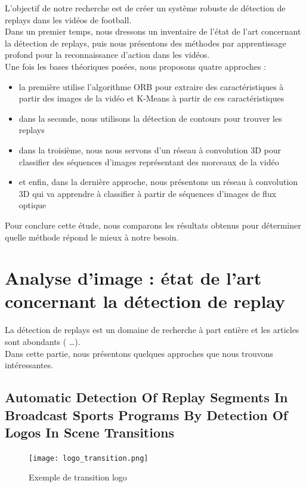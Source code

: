 \documentclass[11pt]{article}
\begin{document}
L'objectif de notre recherche est de créer un système robuste de détection de replays dans les vidéos de football.\\
Dans un premier temps, nous dressons un inventaire de l'état de l'art concernant la détection de replays, puis nous présentons des méthodes par apprentissage profond pour la reconnaissance d'action dans les vidéos.\\
Une fois les bases théoriques posées, nous proposons quatre approches :\\
\begin{itemize}
\item la première utilise l'algorithme ORB \cite{Rublee_2011} pour extraire des caractéristiques à partir des images de la vidéo et K-Means à partir de ces caractéristiques\\
\item dans la seconde, nous utilisons la détection de contours pour trouver les replays\\
\item dans la troisième, nous nous servons d'un réseau à convolution 3D pour classifier des séquences d'images représentant des morceaux de la vidéo\\
\item et enfin, dans la dernière approche, nous présentons un réseau à convolution 3D qui va apprendre à classifier à partir de séquences d'images de flux optique\\
\end{itemize}
Pour conclure cette étude, nous comparons les résultats obtenus pour déterminer quelle méthode répond le mieux à notre besoin.\\

\newpage
\section{Analyse d'image : état de l'art concernant la détection de replay}
\label{sec:org03511db}
La détection de replays est un domaine de recherche à part entière et les articles sont abondants (\cite{Hao_Pan_2002,Ling_Yu_Duan,Chu_2015,Javed_2019} \ldots{}).\\
Dans cette partie, nous présentons quelques approches que nous trouvons intéressantes.\\

\subsection{Automatic Detection Of Replay Segments In Broadcast Sports Programs By Detection Of Logos In Scene Transitions}
\label{sec:org893bcaf}
\begin{figure}[htbp]
\centering
\texttt{[image: logo\_transition.png]}
\caption{Exemple de transition logo \label{logo-transition}}
\end{figure}
\end{document}
